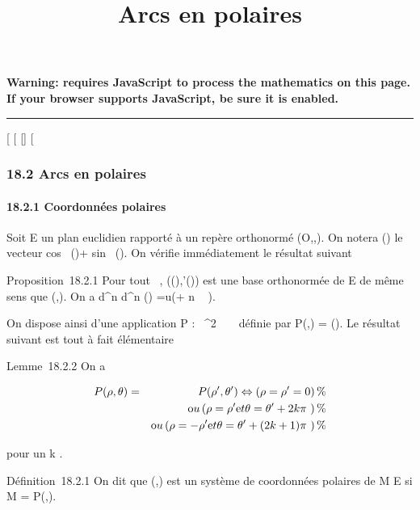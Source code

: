 \documentclass[]{article}
\title{Arcs en polaires}
\author{}
\date{}
\begin{document}
\maketitle

\textbf{Warning: 
requires JavaScript to process the mathematics on this page.\\ If your
browser supports JavaScript, be sure it is enabled.}

\begin{center}\rule{3in}{0.4pt}\end{center}

{[}
{[}
{[}{]}
{[}

\subsubsection{18.2 Arcs en polaires}

\paragraph{18.2.1 Coordonnées polaires}

Soit E un plan euclidien rapporté à un repère orthonormé
(O,\vec\imath,). On notera
\vecu(\theta) le vecteur cos~
(\theta)\vec\imath + sin~
(\theta). On vérifie immédiatement le résultat
suivant

Proposition~18.2.1 Pour tout \theta \in {}~,
(\vecu(\theta),\vecu'(\theta)) est une base
orthonormée de E de même sens que
(\vec\imath,). On a 
d^n \over d\theta^n
\vecu(\theta) =\vec u(\theta + n \pi~
 ).

On dispose ainsi d'une application P : ~^2 \rightarrow~ ~ définie par
P(\rho,\theta) = \rho\vecu(\theta). Le résultat suivant est tout à
fait élémentaire

Lemme~18.2.2 On a

\begin{align*} P(\rho,\theta)& =& P(\rho',\theta')
\Leftrightarrow \left (\rho = \rho' =
0\right ) \%& \\ & &
\text ou \left (\rho =
\rho'\text et \theta = \theta' + 2k\pi~\right ) \%&
\\ & & \text ou
\left (\rho = -\rho'\text et \theta = \theta' + (2k
+ 1)\pi~\right )\%& \\
\end{align*}

pour un k \in {}.

Définition~18.2.1 On dit que (\rho,\theta) est un système de coordonnées
polaires de M \in E si M = P(\rho,\theta).
\end{document}
